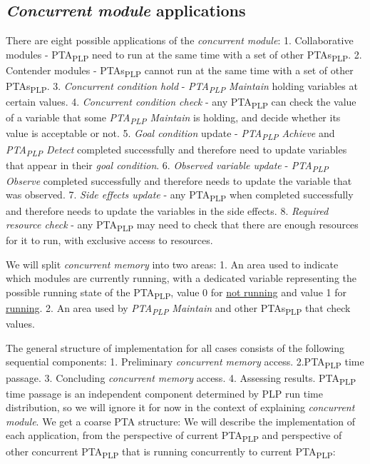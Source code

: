 \subsection{\textit{Concurrent module} applications}
There are eight possible applications of the \textit{concurrent module}: 1. Collaborative modules - PTA\textsubscript{PLP} need to run at the same time with a set of other PTAs\textsubscript{PLP}. 2. Contender modules - PTAs\textsubscript{PLP} cannot run at the same time with a set of other PTAs\textsubscript{PLP}. 3. \textit{\textit{Concurrent condition} hold} - \textit{PTA\textsubscript{PLP} Maintain} holding variables at certain values. 4. \textit{\textit{Concurrent condition} check} - any PTA\textsubscript{PLP} can check the value of a variable that some \textit{PTA\textsubscript{PLP} Maintain} is holding, and decide whether its value is acceptable or not. 5. \textit{\textit{Goal condition}} update - \textit{PTA\textsubscript{PLP} Achieve} and \textit{PTA\textsubscript{PLP} Detect} completed successfully and therefore need to update variables that appear in their \textit{\textit{goal condition}}. 6. \textit{\textit{Observed variable} update} - \textit{PTA\textsubscript{PLP} Observe} completed successfully and therefore needs to update the variable that was observed. 7. \textit{Side effects update} - any PTA\textsubscript{PLP} when completed successfully and therefore needs to update the variables in the side effects. 8. \textit{Required resource check} - any PTA\textsubscript{PLP} may need to check that there are enough resources for it to run, with exclusive access to resources.   
\par We will split \textit{concurrent memory} into two areas: 1. An area used to indicate which modules are currently running, with a dedicated variable representing the possible running state of the PTA\textsubscript{PLP}, value 0 for \underline{not running} and value 1 for \underline{running}. 2. An area used by \textit{PTA\textsubscript{PLP} Maintain} and other PTAs\textsubscript{PLP} that check values.
\par The general structure of implementation for all cases consists of the following sequential components: 1. Preliminary \textit{concurrent memory} access. 2.PTA\textsubscript{PLP} time passage. 3. Concluding \textit{concurrent memory} access. 4. Assessing results. PTA\textsubscript{PLP} time passage is an independent component determined by PLP run time distribution, so we will ignore it for now in the context of explaining \textit{concurrent module}. We get a coarse PTA structure:  We will describe the implementation of each application, from the perspective of current PTA\textsubscript{PLP} and perspective of other concurrent PTA\textsubscript{PLP} that is running concurrently to current PTA\textsubscript{PLP}: \\
